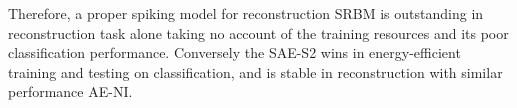 Therefore, \DIFdelbegin {}\DIFdelend \DIFaddbegin {}\DIFaddend a proper spiking model for reconstruction \DIFdelbegin {}\DIFdelend \DIFaddbegin {}\DIFaddend SRBM is outstanding in \DIFaddbegin {}\DIFaddend reconstruction task alone taking no account of the training resources and its poor classification performance.
Conversely the SAE-S2 wins in energy-efficient training and testing on classification, and is stable in reconstruction with similar performance \DIFdelbegin {}\DIFdelend \DIFaddbegin {}\DIFaddend AE-NI.


